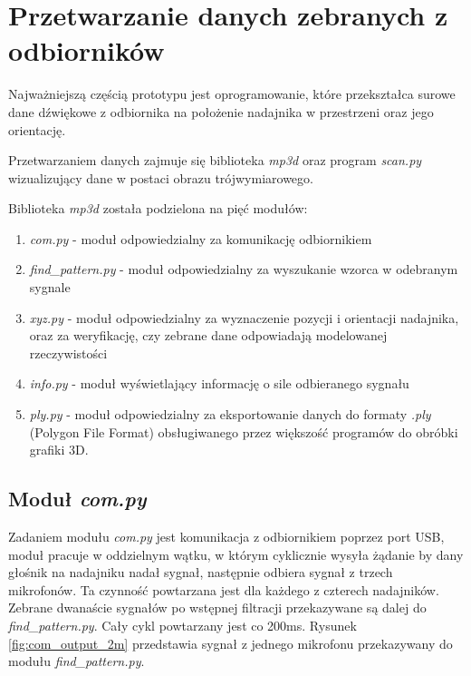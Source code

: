 \chapter{Przetwarzanie danych zebranych z odbiorników}

Najważniejszą częścią prototypu jest oprogramowanie, które przekształca surowe dane dźwiękowe
z odbiornika na położenie nadajnika w przestrzeni oraz jego orientację.

Przetwarzaniem danych zajmuje się biblioteka \textit{mp3d}
oraz program \textit{scan.py} wizualizujący dane w postaci obrazu trójwymiarowego.

Biblioteka \textit{mp3d} została podzielona na pięć modułów:
\begin{enumerate}

 \item \textit{com.py} - moduł odpowiedzialny za komunikację odbiornikiem
 \item \textit{find\_pattern.py} - moduł odpowiedzialny za wyszukanie wzorca w odebranym sygnale
 \item \textit{xyz.py} - moduł odpowiedzialny za wyznaczenie pozycji i orientacji nadajnika, oraz za 
 weryfikację, czy zebrane dane odpowiadają modelowanej rzeczywistości
 \item \textit{info.py} - moduł wyświetlający informację o sile odbieranego sygnału
 \item \textit{ply.py} - moduł odpowiedzialny za eksportowanie danych do formaty \textit{.ply} 
    (Polygon File Format) obsługiwanego przez większość programów do obróbki grafiki 3D.

\end{enumerate}


\section{Moduł \textit{com.py}}

Zadaniem modułu \textit{com.py} jest komunikacja z odbiornikiem poprzez port USB,
moduł pracuje w oddzielnym wątku, w którym cyklicznie wysyła żądanie by dany głośnik na nadajniku nadał sygnał, następnie odbiera
sygnał z trzech mikrofonów.
Ta czynność powtarzana jest dla każdego z czterech nadajników.
Zebrane dwanaście sygnałów po wstępnej filtracji przekazywane są dalej do \textit{find\_pattern.py}. Cały cykl powtarzany jest
co 200ms. Rysunek \ref{fig:com_output_2m} przedstawia sygnał z jednego mikrofonu przekazywany do modułu \textit{find\_pattern.py}.


